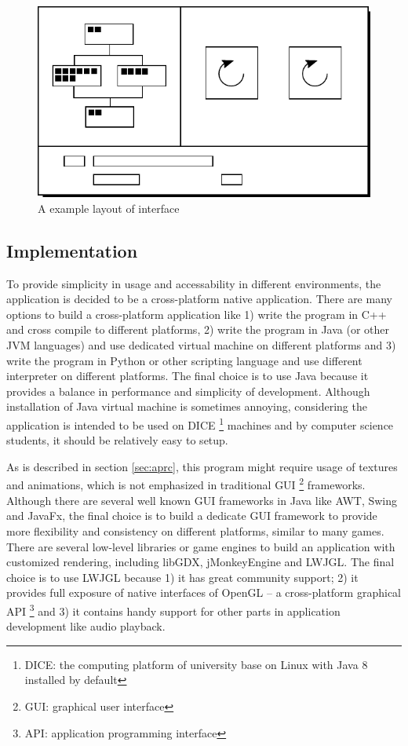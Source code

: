 \documentclass[a4paper,11pt]{article}
\begin{document}
\begin{figure}[htpb]
    \centering
    \includegraphics[width=0.5\columnwidth]{layout.pdf}
    \caption{A example layout of interface}
    \label{fig:layout}
\end{figure}

\subsection{Implementation}

To provide simplicity in usage and accessability in different environments, the application is decided to be a cross-platform native application. There are many options to build a cross-platform application like 1) write the program in C++ and cross compile to different platforms, 2) write the program in Java (or other JVM languages) and use dedicated virtual machine on different platforms and 3) write the program in Python or other scripting language and use different interpreter on different platforms. The final choice is to use Java because it provides a balance in performance and simplicity of development. Although installation of Java virtual machine is sometimes annoying, considering the application is intended to be used on DICE \footnote{DICE: the computing platform of university base on Linux with Java 8 installed by default} machines and by computer science students, it should be relatively easy to setup.

As is described in section \ref{sec:aprc}, this program might require usage of textures and animations, which is not emphasized in traditional GUI \footnote{GUI: graphical user interface} frameworks. Although there are several well known GUI frameworks in Java like AWT, Swing and JavaFx, the final choice is to build a dedicate GUI framework to provide more flexibility and consistency on different platforms, similar to many games. There are several low-level libraries or game engines to build an application with customized rendering, including libGDX, jMonkeyEngine and LWJGL. The final choice is to use LWJGL because 1) it has great community support; 2) it provides full exposure of native interfaces of OpenGL -- a cross-platform graphical API \footnote{API: application programming interface} and 3) it contains handy support for other parts in application development like audio playback.
\end{document}
